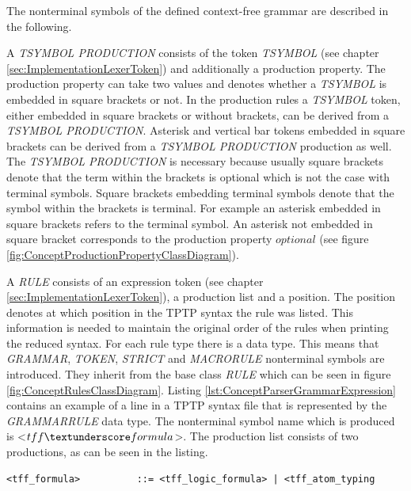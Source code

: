 The nonterminal symbols of the defined context-free grammar are described in the following.

A \textit{T\textunderscore SYMBOL \textunderscore PRODUCTION} consists of the token \textit{T\textunderscore SYMBOL} (see chapter \ref{sec:ImplementationLexerToken}) and additionally a production property.
The production property can take two values and denotes whether a \textit{T\textunderscore SYMBOL} is
embedded in square brackets or not. In the production rules a \textit{T\textunderscore SYMBOL}
token, either embedded in square brackets or without brackets, can be derived
from a \textit{T\textunderscore SYMBOL \textunderscore PRODUCTION}. Asterisk and vertical bar tokens embedded in square
brackets can be derived from a \textit{T\textunderscore SYMBOL \textunderscore PRODUCTION} production as well.
The \textit{T\textunderscore SYMBOL \textunderscore PRODUCTION} is necessary because usually square brackets denote that the term within the brackets is optional which is not the case with terminal symbols.
Square brackets embedding terminal symbols denote that the symbol within the brackets is terminal.
For example an asterisk embedded in square brackets refers to the terminal symbol.
An asterisk not embedded in square bracket corresponds to the production property $optional$ (see figure \ref{fig:ConceptProductionPropertyClassDiagram}).

%
%

A \textit{RULE} consists of an expression token (see chapter \ref{sec:ImplementationLexerToken}), a production list and a position.
The position denotes at which position in the \ac{TPTP} syntax the rule was listed.
This information is needed to maintain the original order of the rules when printing the reduced syntax.
For each rule type there is a data type.
This means that \textit{GRAMMAR}, \textit{TOKEN}, \textit{STRICT} and \textit{MACRO\textunderscore RULE} nonterminal symbols are introduced. They inherit from the base class \textit{RULE} which can be seen in figure \ref{fig:ConceptRulesClassDiagram}.
Listing \ref{lst:ConceptParserGrammarExpression} contains an example of a line in a \ac{TPTP} syntax file that is represented by the \textit{GRAMMAR\textunderscore RULE} data type.
The nonterminal symbol name which is produced is <$tff \textunderscore formula$>.  The production list consists of two productions, as can be seen in the listing.
\begin{lstlisting}[basicstyle=\scriptsize	,caption= Grammar expression,label= lst:ConceptParserGrammarExpression]
<tff_formula>          ::= <tff_logic_formula> | <tff_atom_typing
\end{lstlisting}

